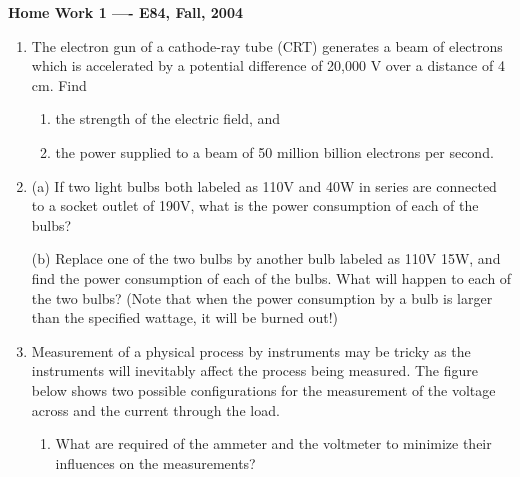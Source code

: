 \usepackage{html}

\begin{center}
{\Large \bf  Home Work 1 ---- E84, Fall, 2004}
\end{center}
\begin{enumerate}

\item The electron gun of a cathode-ray tube (CRT) generates a beam
  of electrons which is accelerated by a potential difference of
  20,000 V over a distance of 4 cm. Find 
\begin{enumerate}
\item the strength of the electric field, and
\item the power supplied to a beam of 50 million  billion electrons per second.
\end{enumerate}

\item (a) If two light bulbs both labeled as 110V and 40W in series are
connected to a socket outlet of 190V, what is the power consumption of 
each of the bulbs?


(b) Replace one of the two bulbs by another bulb labeled as 110V 15W, and
find the power consumption of each of the bulbs. What will happen to each
of the two bulbs? (Note that when the power consumption by a bulb is larger
than the specified wattage, it will be burned out!)


\item Measurement of a physical process by instruments may be tricky as
the instruments will inevitably affect the process being measured. The 
figure below shows two possible configurations for the measurement of the
voltage across and the current through the load. 


\begin{enumerate}
\item What are required of the ammeter and the voltmeter to minimize their
	influences on the measurements? 



\end{enumerate}
\end{enumerate}
